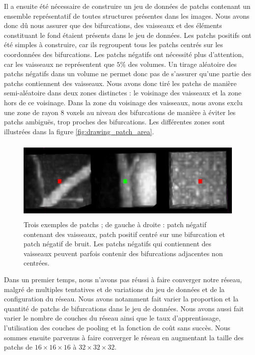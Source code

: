 Il a ensuite été nécessaire de construire un jeu de données de patchs contenant un ensemble représentatif de toutes structures présentes dans les images. Nous avons donc dû nous assurer que des bifurcations, des vaisseaux et des éléments constituant le fond étaient présents dans le jeu de données.
Les patchs positifs ont été simples à construire, car ils regroupent tous les patchs centrés sur les coordonnées des bifurcations. Les patchs négatifs ont nécessité plus d'attention, car les vaisseaux ne représentent que $5\percent{}$ des volumes. Un tirage aléatoire des patchs négatifs dans un volume ne permet donc pas de s'assurer qu'une partie des patchs contiennent des vaisseaux. Nous avons donc tiré les patchs de manière semi-aléatoire dans deux zones distinctes : le voisinage des vaisseaux et la zone hors de ce voisinage. Dans la zone du voisinage des vaisseaux, nous avons exclu une zone de rayon $8$ voxels au niveau des bifurcations de manière à éviter les patchs ambiguës, trop proches des bifurcations. Les différentes zones sont illustrées dans la figure \ref{fig:drawing_patch_area}.
\begin{figure}[!ht]
    \centering
    \includegraphics[height=4cm]{Images/exp_patchs_exemple.png}
    \caption{Trois exemples de patchs ; de gauche à droite : patch négatif contenant des vaisseaux, patch positif centré sur une bifurcation et patch négatif de bruit. Les patchs négatifs qui contiennent des vaisseaux peuvent parfois contenir des bifurcations adjacentes non centrées.}
    \label{fig:exp_patchs}
\end{figure}

Dans un premier temps, nous n'avons pas réussi à faire converger notre réseau, malgré de multiples tentatives et de variations du jeu de données et de la configuration du réseau. Nous avons notamment fait varier la proportion et la quantité de patchs de bifurcations dans le jeu de données. Nous avons aussi fait varier le nombre de couches du réseau ainsi que le taux d'apprentissage, l'utilisation des couches de pooling et la fonction de coût sans succès. Nous sommes ensuite parvenus à faire converger le réseau en augmentant la taille des patchs de  $16 \times 16 \times 16$ à $32 \times 32 \times 32$.

